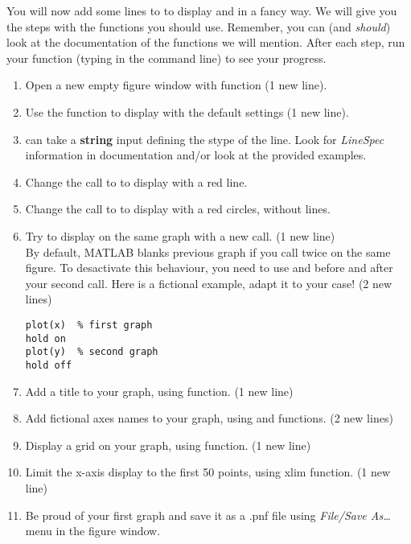 \documentclass{article}
\begin{document}
You will now add some lines to  to display  and  in a fancy way.
We will give you the steps with the functions you should use.
Remember, you can (and \emph{should}) look at the documentation of the functions we will mention.
After each step, run your function (typing  in the command line) to see your progress.
\begin{enumerate}
  \item Open a new empty figure window with  function (1 new line).
  \item Use the  function to display  with the default settings (1 new line).
  \item {} can take a \textbf{string} input defining the stype of the line.
    Look for \emph{LineSpec} information in  documentation and/or look at the provided examples.
  \item Change the call to  to display  with a red line.
  \item Change the call to  to display  with a red circles, without lines.
  \item Try to display  on the same graph with a new  call. (1 new line)\\
    By default, MATLAB blanks previous graph if you call  twice on the same figure.
    To desactivate this behaviour, you need to use  and  before and after
    your second  call.
    Here is a fictional example, adapt it to your case! (2 new lines)
\begin{lstlisting}
plot(x)  % first graph
hold on
plot(y)  % second graph
hold off
\end{lstlisting}
  \item Add a title to your graph, using  function. (1 new line)
  \item Add fictional axes names to your graph, using  and  functions. (2 new lines)
  \item Display a grid on your graph, using  function. (1 new line)
  \item Limit the x-axis display to the first 50 points, using \mcode xlim function. (1 new line)
  \item Be proud of your first graph and save it as a .pnf file using \emph{File/Save As\dots} menu in the figure window.
\end{enumerate}
\end{document}
